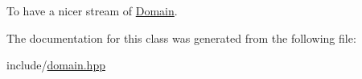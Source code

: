 To have a nicer stream of \hyperlink{classghost_1_1Domain}{Domain}. 



The documentation for this class was generated from the following file\+:\begin{DoxyCompactItemize}
\item 
include/\hyperlink{domain_8hpp}{domain.\+hpp}\end{DoxyCompactItemize}

